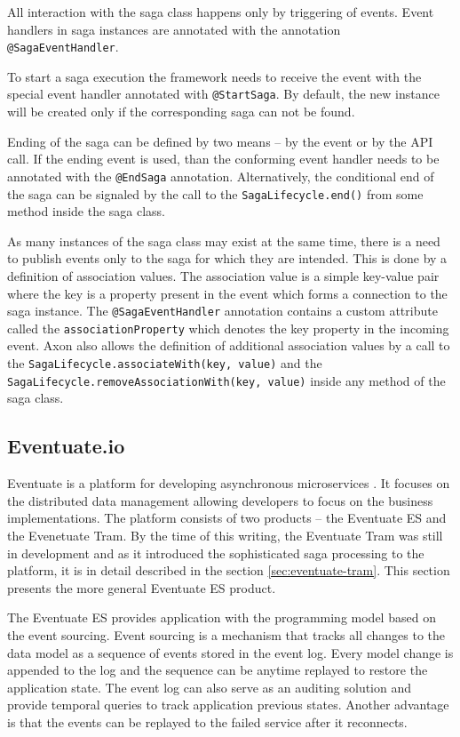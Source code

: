 \documentclass[oneside,
  digital, %
  table,   %
  nolof,     %
  nolot,     %
]{fithesis3}
\begin{document}
All interaction with the saga class happens only by triggering of events. Event handlers in saga instances are annotated with the annotation \texttt{@SagaEventHandler}. 

To start a saga execution the framework needs to receive the event with the special event handler annotated with \texttt{@StartSaga}. By default, the new instance will be created only if the corresponding saga can not be found.

Ending of the saga can be defined by two means -- by the event or by the API call. If the ending event is used, than the conforming event handler needs to be annotated with the \texttt{@EndSaga} annotation. Alternatively, the conditional end of the saga can be signaled by the call to the \texttt{SagaLifecycle.end()} from some method inside the saga class.

As many instances of the saga class may exist at the same time, there is a need to publish events only to the saga for which they are intended. This is done by a definition of association values. The association value is a simple key-value pair where the key is a property present in the event which forms a connection to the saga instance. The \texttt{@SagaEventHandler} annotation contains a custom attribute called the \texttt{associationProperty} which denotes the key property in the incoming event. Axon also allows the definition of additional association values by a call to the \texttt{SagaLifecycle.associateWith(key, value)} and the \texttt{SagaLifecycle.removeAssociationWith(key, value)} inside any method of the saga class.

\subsection{Eventuate.io}

Eventuate is a platform for developing asynchronous microservices \cite{eventuate.io}. It focuses on the distributed data management allowing developers to focus on the business implementations. The platform consists of two products -- the Eventuate ES and the Evenetuate Tram. By the time of this writing, the Eventuate Tram was still in development and as it introduced the sophisticated saga processing to the platform, it is in detail described in the section \ref{sec:eventuate-tram}. This section presents the more general Eventuate ES product.

The Eventuate ES provides application with the programming model based on the event sourcing. Event sourcing is a mechanism that tracks all changes to the data model as a sequence of events stored in the event log. Every model change is appended to the log and the sequence can be anytime replayed to restore the application state. The event log can also serve as an auditing solution and provide temporal queries to track application previous states. Another advantage is that the events can be replayed to the failed service after it reconnects.
\end{document}
